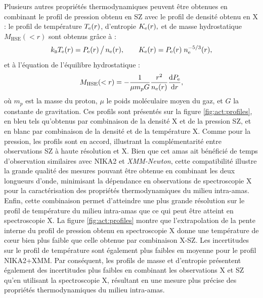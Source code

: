Plusieurs autres propriétés thermodynamiques peuvent être obtenues en combinant le profil de pression obtenu en SZ avec le profil de densité obtenu en X : le profil de température $T_{\rm e}(r)$, d'entropie $K_{\rm e}(r),$ et de masse hydrostatique $M_\mathrm{HSE}(<r)$ sont obtenus grâce à :
\begin{equation}
    k_\textsc{b} T_{\rm e}(r) = P_{\rm e}(r) \,\big/\, n_{\rm e}(r), \qquad K_{\rm e}(r) = P_{\rm e}(r)\;n_{\rm e}^{-5/3}(r),
\end{equation}
et à l'équation de l'équilibre hydrostatique :
\begin{equation}
    M_\mathrm{HSE}(<r) = -\frac{1}{\mu m_p G}\frac{r^2}{n_{\rm e}(r)}\frac{\mathrm{d} P_{\rm e}}{\mathrm{d} r},
    \label{eq:act:mhse}
\end{equation}
où $m_p$ est la masse du proton, $\mu$ le poids moléculaire moyen du gaz, et $G$ la constante de gravitation.
Ces profils sont présentés sur la figure \ref{fig:act:profiles}, en bleu tels qu'obtenus par combinaison de la densité X et de la pression SZ, et en blanc par combinaison de la densité et de la température X.
Comme pour la pression, les profils sont en accord, illustrant la complémentarité entre observations SZ à haute résolution et X.
Bien que cet amas ait bénéficié de temps d'observation similaires avec NIKA2 et \textit{XMM-Newton}, cette compatibilité illustre la grande qualité des mesures pouvant être obtenue en combinant les deux longueurs d'onde, minimisant la dépendance en observations de spectroscopie X pour la caractérisation des propriétés thermodynamiques du milieu intra-amas.
Enfin, cette combinaison permet d'atteindre une plus grande résolution sur le profil de température du milieu intra-amas que ce qui peut être atteint en spectroscopie X.
La figure \ref{fig:act:profiles} montre que l'extrapolation de la pente interne du profil de pression obtenu en spectroscopie X donne une température de cœur bien plus faible que celle obtenue par combinaison X-SZ.
Les incertitudes sur le profil de température sont également plus faibles en moyenne pour le profil NIKA2+XMM.
Par conséquent, les profils de masse et d'entropie présentent également des incertitudes plus faibles en combinant les observations X et SZ qu'en utilisant la spectroscopie X, résultant en une mesure plus précise des propriétés thermodynamiques du milieu intra-amas.

